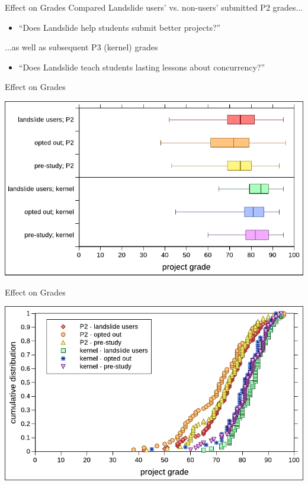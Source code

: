 \documentclass[xcolor=dvipsnames]{beamer}
\begin{document}
\begin{frame}{Effect on Grades}
	Compared Landslide users' vs. non-users' submitted P2 grades...
	\begin{itemize}
		\item ``Does Landslide help students submit better projects?''
	\end{itemize}
	\linegap

	...as well as subsequent P3 (kernel) grades
	\begin{itemize}
		\item ``Does Landslide teach students lasting lessons about concurrency?''
	\end{itemize}
\end{frame}

\begin{frame}{Effect on Grades}
	\begin{center}
		\includegraphics[width=\textwidth]{../photo-of-ze-studence.pdf}
	\end{center}
\end{frame}

\begin{frame}{Effect on Grades}
	\begin{center}
		\includegraphics[width=\textwidth]{../photo-of-ze-studence-cdf.pdf}
	\end{center}
\end{frame}
\end{document}
